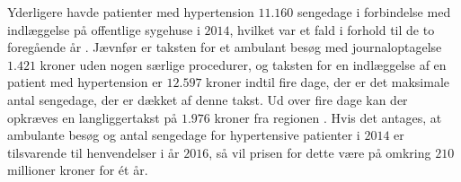 \noindent
Yderligere havde patienter med hypertension $11.160$ sengedage i forbindelse med indlæggelse på offentlige sygehuse i $2014$, hvilket var et fald i forhold til de to foregående år \citep{sundhedsdatastyrelsen2016}. Jævnfør \citeauthor{takstvejledning2016} er taksten for et ambulant besøg  med journaloptagelse $1.421$ kroner uden nogen særlige procedurer, og taksten for en indlæggelse af en patient med hypertension er $12.597$ kroner indtil fire dage, der er det maksimale antal sengedage, der er dækket af denne takst. Ud over fire dage kan der opkræves en langliggertakst på $1.976$ kroner fra regionen \citep{takstvejledning2016}. Hvis det antages, at ambulante besøg og antal sengedage for hypertensive patienter i $2014$ er tilsvarende til henvendelser i år $2016$, så vil prisen for dette være på omkring $210$ millioner kroner for ét år. 
